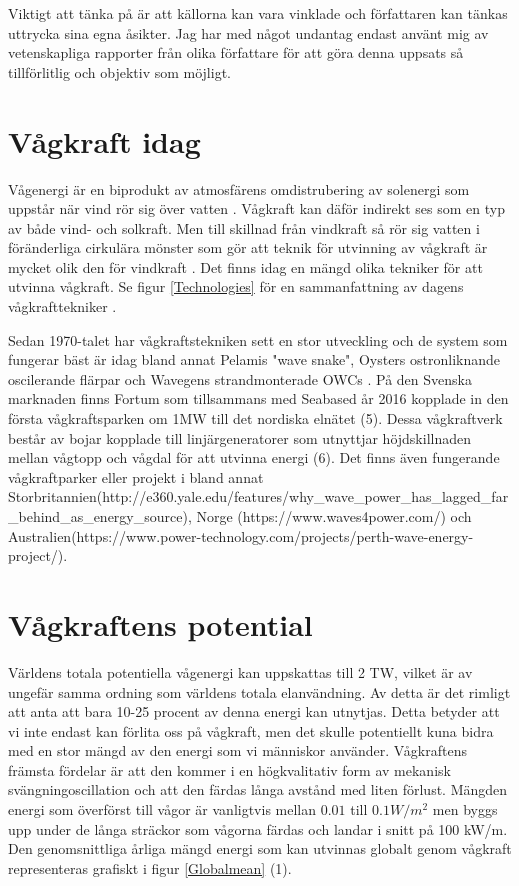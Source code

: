 \documentclass[10pt,a4paper,oneside]{article}
\begin{document}
Viktigt att tänka på är att källorna kan vara vinklade och författaren kan tänkas uttrycka sina egna åsikter. Jag har med något undantag endast använt mig av vetenskapliga rapporter från olika författare för att göra denna uppsats så tillförlitlig och objektiv som möjligt.\newpage

\section{Vågkraft idag}
Vågenergi är en biprodukt av atmosfärens omdistrubering av solenergi som uppstår när vind rör sig över vatten \cite{Cruz}. Vågkraft kan däför indirekt ses som en typ av både vind- och solkraft. Men till skillnad från vindkraft så rör sig vatten i föränderliga cirkulära mönster som gör att teknik för utvinning av vågkraft är mycket olik den för vindkraft \cite{Elliott}. Det finns idag en mängd olika tekniker för att utvinna vågkraft. Se figur \ref{Technologies} för en sammanfattning av dagens vågkrafttekniker \cite{IRENA}.

Sedan 1970-talet har vågkraftstekniken sett en stor utveckling och de system som fungerar bäst är idag bland annat Pelamis "wave snake", Oysters ostronliknande oscilerande flärpar och Wavegens strandmonterade  OWCs \cite{Elliott}. På den Svenska marknaden finns Fortum som tillsammans med Seabased år 2016 kopplade in den första vågkraftsparken om 1MW till det nordiska elnätet (5). Dessa vågkraftverk består av bojar kopplade till linjärgeneratorer som utnyttjar höjdskillnaden mellan vågtopp och vågdal för att utvinna energi (6). Det finns även fungerande vågkraftparker eller projekt i bland annat Storbritannien(http://e360.yale.edu/features/why_wave_power_has_lagged_far_behind_as_energy_source), Norge (https://www.waves4power.com/) och Australien(https://www.power-technology.com/projects/perth-wave-energy-project/).  


\section{Vågkraftens potential}
Världens totala potentiella vågenergi kan uppskattas till 2 TW, vilket är av ungefär samma ordning som världens totala elanvändning. Av detta är det rimligt att anta att bara 10-25 procent av denna energi kan utnytjas. Detta betyder att vi inte endast kan förlita oss på vågkraft, men det skulle potentiellt kuna bidra med en stor mängd av den energi som vi människor använder. Vågkraftens främsta fördelar är att den kommer i en högkvalitativ form av mekanisk svängningoscillation och att den färdas långa avstånd med liten förlust. Mängden energi som överförst till vågor är vanligtvis mellan \begin{math} 0.01  \end{math} till \begin{math} 0.1 W/m^2 \end{math} men byggs upp under de långa sträckor som vågorna färdas och landar i snitt på 100 kW/m. Den genomsnittliga årliga mängd energi som kan utvinnas globalt genom vågkraft representeras grafiskt i figur \ref{Globalmean} (1). 
\end{document}
